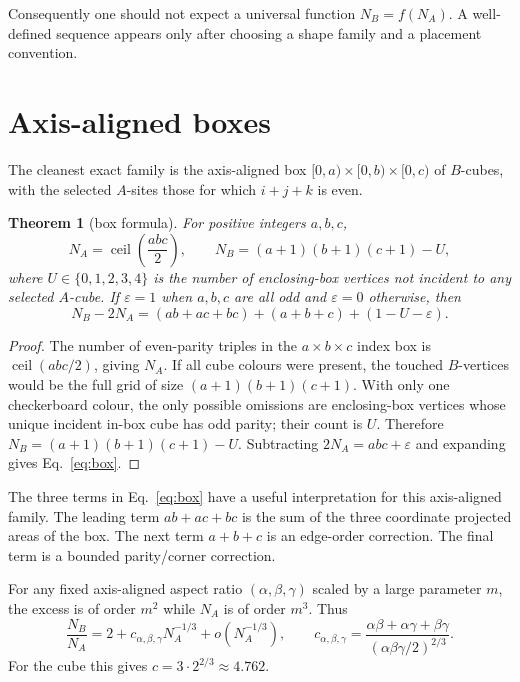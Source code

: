 \documentclass[11pt]{article}
\theoremstyle{plain}
\newtheorem{theorem}{Theorem}[section]
\theoremstyle{definition}
\theoremstyle{remark}
\newcommand{\NA}{N_{\!A}}
\newcommand{\NB}{N_{\!B}}
\newcommand{\eps}{\varepsilon}
\DeclareMathOperator{\ceil}{ceil}
\begin{document}
Consequently one should not expect a universal function $\NB=f(\NA)$.  A
well-defined sequence appears only after choosing a shape family and a placement
convention.

\section{Axis-aligned boxes}\label{sec:boxes}

The cleanest exact family is the axis-aligned box
$[0,a)\times[0,b)\times[0,c)$ of $B$-cubes, with the selected $A$-sites those
for which $i+j+k$ is even.

\begin{theorem}[box formula]\label{thm:box}
For positive integers $a,b,c$,
\[
\NA=\ceil\!\left(\frac{abc}{2}\right),
\qquad
\NB=(a+1)(b+1)(c+1)-U,
\]
where $U\in\{0,1,2,3,4\}$ is the number of enclosing-box vertices not incident
to any selected $A$-cube.  If $\eps=1$ when $a,b,c$ are all odd and $\eps=0$
otherwise, then
\[
\boxed{\;\NB-2\NA=(ab+ac+bc)+(a+b+c)+(1-U-\eps).\;}
\tag{1}\label{eq:box}
\]
\end{theorem}

\begin{proof}
The number of even-parity triples in the $a\times b\times c$ index box is
$\ceil(abc/2)$, giving $\NA$.  If all cube colours were present, the touched
$B$-vertices would be the full grid of size $(a+1)(b+1)(c+1)$.  With only one
checkerboard colour, the only possible omissions are enclosing-box vertices
whose unique incident in-box cube has odd parity; their count is $U$.  Therefore
$\NB=(a+1)(b+1)(c+1)-U$.  Subtracting $2\NA=abc+\eps$ and expanding gives
Eq.~\eqref{eq:box}.
\end{proof}

The three terms in Eq.~\eqref{eq:box} have a useful interpretation for this
axis-aligned family.  The leading term $ab+ac+bc$ is the sum of the three
coordinate projected areas of the box.  The next term $a+b+c$ is an edge-order
correction.  The final term is a bounded parity/corner correction.

For any fixed axis-aligned aspect ratio $(\alpha,\beta,\gamma)$ scaled by a
large parameter $m$, the excess is of order $m^2$ while $\NA$ is of order
$m^3$.  Thus
\[
\frac{\NB}{\NA}=2+c_{\alpha,\beta,\gamma}\NA^{-1/3}+o(\NA^{-1/3}),
\qquad
c_{\alpha,\beta,\gamma}=
\frac{\alpha\beta+\alpha\gamma+\beta\gamma}{(\alpha\beta\gamma/2)^{2/3}}.
\tag{2}\label{eq:box_asym}
\]
For the cube this gives $c=3\cdot2^{2/3}\approx4.762$.
\end{document}

